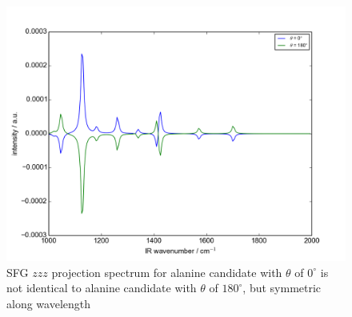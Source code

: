 \begin{figure}[!ht] 
\centering
\includegraphics[scale=0.7]{Figures/Ala_candidates_plotting_sfg_zzz_2.png}
\caption{SFG $zzz$ projection spectrum for alanine candidate with $\theta$ of $0^{\circ}$ is not identical to alanine candidate with $\theta$ of $180^{\circ}$, but symmetric along wavelength} 
\label{fig:A.3}
\end{figure}

